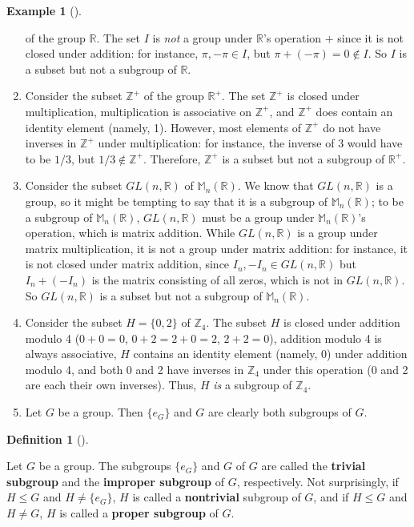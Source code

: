 \documentclass[10pt,]{book}
\newcommand{\terminology}[1]{\textbf{#1}}
\theoremstyle{plain}
\theoremstyle{definition}
\newtheorem{definition}[theorem]{Definition}
\theoremstyle{definition}
\theoremstyle{definition}
\newtheorem{example}[theorem]{Example}
\theoremstyle{definition}
\numberwithin{equation}{section}
\def\Z{\mathbb{Z}}
\def\R{\mathbb{R}}
\def\M{\mathbb{M}}
\begin{document}
\begin{example}[]
\begin{enumerate}
            of the group \(\R\). The set
            \(I\) is \emph{not} a group under \(\R\)'s
            operation \(+\) since it is not closed under addition:
            for instance, \(\pi, -\pi \in I\), but
            \(\pi+(-\pi)=0\not\in I\).  So \(I\) is a subset but not a
            subgroup of \(\R\).
\item\hypertarget{li-189}{}
            Consider the subset \(\Z^+\) of the group \(\R^+\).
            The set \(\Z^+\) is closed under multiplication, multiplication is
            associative on \(\Z^+\), and \(\Z^+\) does contain an identity element
            (namely, 1).  However, most elements of \(\Z^+\) do not have inverses
            in \(\Z^+\) under multiplication: for instance, the inverse of \(3\)
            would have to be \(1/3\), but \(1/3\not\in \Z^+\).  Therefore, \(\Z^+\) is
            a subset but not a subgroup of \(\R^+\).
\item\hypertarget{li-190}{}
            Consider the subset \(GL(n,\R)\) of \(\M_n(\R)\).  We know that \(GL(n,\R)\) is a group, so it might be tempting to say that it is a subgroup of \(\M_n(\R)\); to be a subgroup of \(\M_n(\R)\), \(GL(n,\R)\) must be a group under \(\M_n(\R)\)'s operation, which is matrix addition.  While \(GL(n,\R)\) is a group under matrix multiplication, it is not a group under matrix addition: for instance, it is not closed under matrix addition, since \(I_n, -I_n\in GL(n,\R)\) but \(I_n+(-I_n)\) is the matrix consisting of all zeros, which is not in \(GL(n,\R)\). So \(GL(n,\R)\) is a subset but not a subgroup of \(\M_n(\R)\).
\item\hypertarget{li-191}{}
            Consider the subset \(H=\{0,2\}\) of \(\Z_4\).  The subset \(H\) is closed under addition modulo 4 (\(0+0=0\), \(0+2=2+0=2\), \(2+2=0\)), addition modulo 4 is always associative, \(H\) contains an identity element (namely, 0) under addition modulo 4, and both 0 and 2 have inverses in \(\Z_4\) under this operation (0 and 2 are each their own inverses).  Thus, \(H\) \emph{is} a subgroup of \(\Z_4\).
\item\hypertarget{li-192}{}
            Let \(G\) be a group.  Then \(\{e_G\}\) and \(G\) are clearly both subgroups of \(G\).
\end{enumerate}
\end{example}
\begin{definition}[{}]\label{definition-35}

        Let \(G\) be a group. The subgroups \(\{e_G\}\) and \(G\) of
        \(G\) are called the \terminology{trivial subgroup} and the \terminology{improper
        subgroup} of \(G\), respectively. Not surprisingly, if \(H\leq G\)
        and \(H\neq \{e_G\}\), \(H\) is called a \terminology{nontrivial} subgroup
        of \(G\), and if \(H\leq G\) and \(H\neq G\), \(H\) is called a \terminology{proper subgroup} of \(G\).%
\end{definition}
\end{document}
